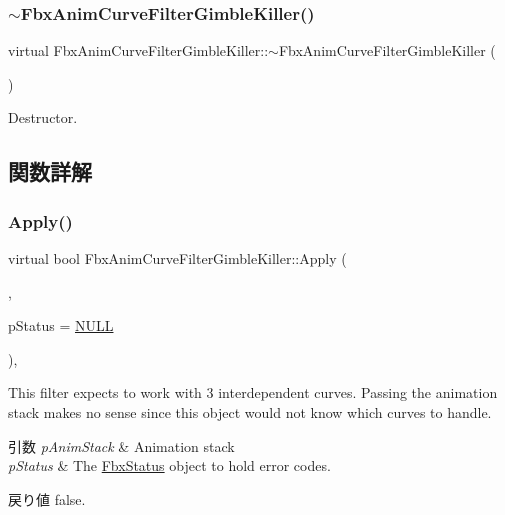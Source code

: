 \subsubsection{\texorpdfstring{$\sim$\+Fbx\+Anim\+Curve\+Filter\+Gimble\+Killer()}{~FbxAnimCurveFilterGimbleKiller()}}
{\footnotesize\ttfamily virtual Fbx\+Anim\+Curve\+Filter\+Gimble\+Killer\+::$\sim$\+Fbx\+Anim\+Curve\+Filter\+Gimble\+Killer (\begin{DoxyParamCaption}{ }\end{DoxyParamCaption})\hspace{0.3cm}{\ttfamily [virtual]}}



Destructor. 



\subsection{関数詳解}
\mbox{\label{class_fbx_anim_curve_filter_gimble_killer_acee7b2b1c995cc079152b5ff8c96bfff}} 
\subsubsection{\texorpdfstring{Apply()}{Apply()}\hspace{0.1cm}{\footnotesize\ttfamily [1/5]}}
{\footnotesize\ttfamily virtual bool Fbx\+Anim\+Curve\+Filter\+Gimble\+Killer\+::\+Apply (\begin{DoxyParamCaption}\item[{\hyperlink{class_fbx_anim_stack}{Fbx\+Anim\+Stack} $\ast$}]{,  }\item[{\hyperlink{class_fbx_status}{Fbx\+Status} $\ast$}]{p\+Status = {\ttfamily \hyperlink{fbxarch_8h_a070d2ce7b6bb7e5c05602aa8c308d0c4}{N\+U\+LL}} }\end{DoxyParamCaption})\hspace{0.3cm}{\ttfamily [inline]}, {\ttfamily [virtual]}}

This filter expects to work with 3 interdependent curves. Passing the animation stack makes no sense since this object would not know which curves to handle. 
\begin{DoxyParams}{引数}
{\em p\+Anim\+Stack} & Animation stack \\
\hline
{\em p\+Status} & The \hyperlink{class_fbx_status}{Fbx\+Status} object to hold error codes. \\
\hline
\end{DoxyParams}
\begin{DoxyReturn}{戻り値}
{\ttfamily false}. 
\end{DoxyReturn}



